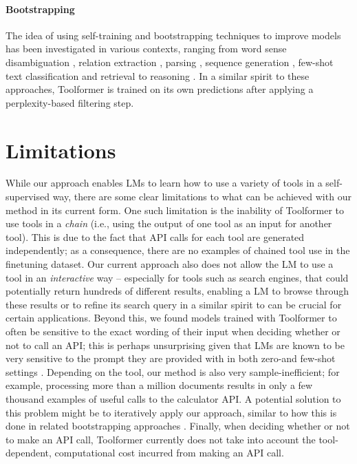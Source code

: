 \documentclass[11pt]{article}
\newcommand{\ours}[0]{Toolformer}
\begin{document}
\begin{CJK*}{UTF8}{gbsn}
\paragraph{Bootstrapping} The idea of using self-training and bootstrapping techniques to improve models has been investigated in various contexts, ranging from word sense disambiguation \citep{yarowsky-1995-unsupervised}, relation extraction \citep{brin1999extracting,agichtein2000snowball}, parsing \citep{mcclosky-etal-2006-effective,reichart-rappoport-2007-self}, sequence generation \citep{He2020Revisiting}, few-shot text classification \citep{schick-schutze-2021-exploiting} and retrieval \citep{izacard2021distilling} to reasoning \citep{zelikman2022star}. In a similar spirit to these approaches, \ours{} is trained on its own predictions after applying a perplexity-based filtering step.

\section{Limitations}

While our approach enables LMs to learn how to use a variety of tools in a self-supervised way, there are some clear limitations to what can be achieved with our method in its current form. One such limitation is the inability of \ours{} to use tools in a \emph{chain} (i.e., using the output of one tool as an input for another tool). This is due to the fact that API calls for each tool are generated independently; as a consequence, there are no examples of chained tool use in the finetuning dataset. Our current approach also does not allow the LM to use a tool in an \emph{interactive} way -- especially for tools such as search engines, that could potentially return hundreds of different results, enabling a LM to browse through these results or to refine its search query in a similar spirit to \citet{nakano2021webgpt} can be crucial for certain applications. Beyond this, we found models trained with \ours{} to often be sensitive to the exact wording of their input when deciding whether or not to call an API; this is perhaps unsurprising given that LMs are known to be very sensitive to the prompt they are provided with in both zero-and few-shot settings \citep{jiang-etal-2020-know,schick-schutze-2021-exploiting}. Depending on the tool, our method is also very sample-inefficient; for example, processing more than a million documents results in only a few thousand examples of useful calls to the calculator API. A potential solution to this problem might be to iteratively apply our approach, similar to how this is done in related bootstrapping approaches \citep{schick-schutze-2021-exploiting,izacard2021distilling,parisi2022talm}. Finally, when deciding whether or not to make an API call, \ours{} currently does not take into account the tool-dependent, computational cost incurred from making an API call.


\end{CJK*}
\end{document}
